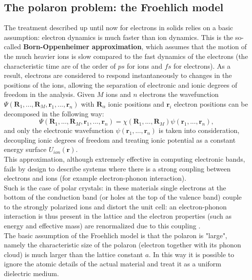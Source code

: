 \subsection{The polaron problem: the Froehlich model}
The treatment described up until now for electrons in solids relies on a basic assumption: electron dynamics is much faster than ion 
dynamics. This is the so-called \textbf{Born-Oppenheimer approximation}, which assumes that the motion of the much heavier ions is 
slow compared to the fast dynamics of the electrons (the characteristic time are of the order of $ps$ for ions and $fs$ for 
electrons). As a result, electrons are considered to respond instantaneously to changes in the positions of the ions, allowing 
the separation of electronic and ionic degrees of freedom in the analysis. Given $M$ ions and $n$ electrons the wavefunction 
$\Psi(\mathbf{R}_1,...,\mathbf{R}_M,\mathbf{r}_1,...,\mathbf{r}_n)$ with $\mathbf{R}_\alpha$ ionic positions and $\mathbf{r}_i$ electron positions can be decomposed in the following way:
\begin{equation}
    \Psi(\mathbf{R}_1,...,\mathbf{R}_M,\mathbf{r}_1,...,\mathbf{r}_n)=\chi(\mathbf{R}_1,...,\mathbf{R}_M)\psi(\mathbf{r}_1,...,\mathbf{r}_n),
\end{equation}
and only the electronic wavefunction $\psi(\mathbf{r}_1,...,\mathbf{r}_n)$ is taken into consideration, decoupling ionic degrees of freedom and treating 
ionic potential as a constant energy surface $U_{ion}(\mathbf{r})$.\\
This approximation, although extremely effective in computing electronic bands, fails by design to describe systems where there is a 
strong coupling between electrons and ions (for example electron-phonon interaction).\\
Such is the case of polar crystals: in these materials single electrons at the bottom of the conduction band (or holes at the top of 
the valence band) couple to the strongly polarized ions and distort the unit cell: an electron-phonon interaction is thus present 
in the lattice and the electron properties (such as energy and effective mass) are renormalized due to this coupling \cite{frohlich1954electrons}.\\
The basic assumption of the Froehlich model is that the polaron is "large", namely the characteristic size of the polaron (electron together 
with its phonon cloud) is much larger than the lattice constant $a$. In this way it is possible to ignore the atomic details of the actual 
material and treat it as a uniform dielectric medium.\\
